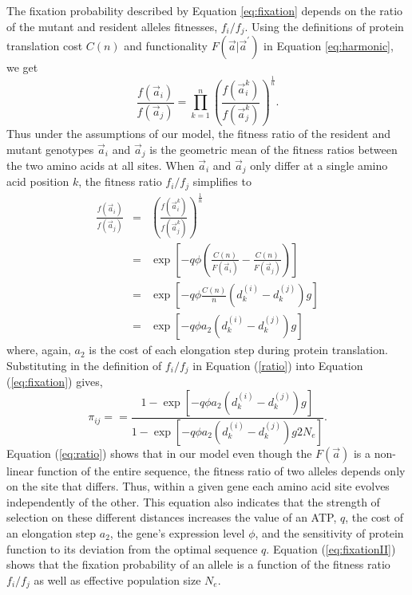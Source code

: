 \documentclass[13pt]{article}
\newcommand{\avec}{\ensuremath{\vec{a}}\xspace}
\newcommand{\avecopt}{\ensuremath{\vec{a}^\prime}\xspace}
\begin{document}
The fixation probability described by Equation \ref{eq:fixation} depends on the ratio of the mutant and resident alleles fitnesses,  $f_i/f_j$.
Using the definitions of protein translation cost $C(n)$ and functionality $F\left(\avec|\avecopt\right)$ in Equation \ref{eq:harmonic}, we get
\begin{equation}
\frac{f\left(\avec_i\right)}{f\left(\avec_j\right)} = \prod_{k=1}^n\left( \frac{f\left(\avec_i^k\right)}{f\left(\avec_j^k\right)}\right)^{\frac{1}{n}}.
\end{equation}
Thus under the assumptions of our model, the fitness ratio of the resident and mutant genotypes $\avec_i$ and $\avec_j$ is the geometric mean of the fitness ratios between the two amino acids at all sites.
When $\avec_i$ and $\avec_j$ only differ at a single amino acid position $k$, the fitness ratio $f_i/f_j$ simplifies to  
\begin{eqnarray}
\frac{f\left(\avec_i\right)}{f\left(\avec_j\right)} & = & \left( \frac{f\left(\avec_i^k\right)}{f\left(\avec_j^k\right)}\right)^{\frac{1}{n}}\\
 & = &\exp \left[-q \phi \left( \frac{ C(n) }{F\left(\avec_i \right)} - \frac{ C(n)}{F\left(\avec_j \right)}\right)\right] \nonumber\\
& = & \exp\left[ - q \phi \frac{C(n)}{n}\left(d_k^{(i)} - d_k^{(j)}\right) g\right]\\
& = & \exp\left[ - q \phi a_2 \left(d_k^{(i)} - d_k^{(j)}\right) g\right] \label{eq:ratio}
\end{eqnarray}
where, again, $a_2$ is the cost of each elongation step during protein translation. 
Substituting in the definition of $f_i/f_j$ in Equation (\ref{ratio}) into Equation (\ref{eq:fixation}) gives,
\begin{equation}
\pi_{ij} =  = \frac{1-\exp\left[ - q \phi a_2 \left(d_k^{(i)} - d_k^{(j)}\right) g\right]}{1-\exp\left[ - q \phi a_2 \left(d_k^{(i)} - d_k^{(j)}\right) g 2N_e\right]}.
\label{eq:fixationII}
\end{equation}
Equation (\ref{eq:ratio}) shows that in our model even though the $F(\avec)$ is a non-linear function of the entire sequence,  the fitness ratio of two alleles depends only on the site that differs.
Thus,  within a given gene each amino acid site  evolves independently of the other.
This equation also indicates that the strength of selection on these different distances increases the value of an ATP, $q$, the cost of an elongation step $a_2$, the gene's expression level $\phi$, and the sensitivity of protein function to its deviation from the optimal sequence $q$.
Equation (\ref{eq:fixationII}) shows that the fixation probability of an allele is a function of the fitness ratio $f_i/f_j$ as well as effective population size $N_e$.
\end{document}
